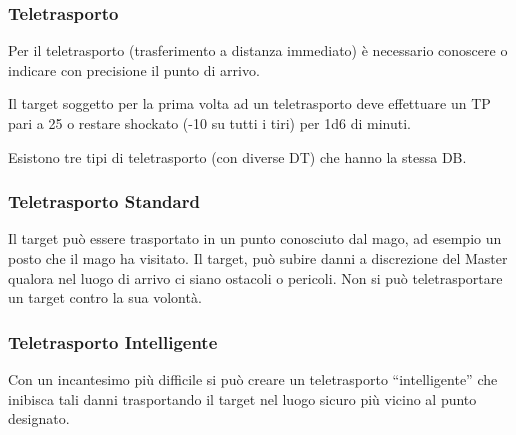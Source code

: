 

\subsubsection{Teletrasporto} Per il teletrasporto (trasferimento a distanza
immediato) \`e necessario conoscere o indicare con precisione il
punto di arrivo. 

Il target soggetto per la prima volta ad un
teletrasporto deve effettuare un TP pari a 25 o restare shockato (-10
su tutti i tiri) per 1d6 di minuti. 

Esistono tre tipi di teletrasporto
(con diverse DT) che hanno la stessa DB. 


\subsubsection{Teletrasporto Standard}
 Il target pu\`o essere trasportato in un punto conosciuto
dal mago, ad esempio un posto che il mago ha visitato. Il target,
pu\`o subire danni a discrezione del Master qualora nel luogo di
arrivo ci siano ostacoli o pericoli. Non si pu\`o teletrasportare un
target contro la sua volont\`a.


\subsubsection{Teletrasporto Intelligente}  
Con un incantesimo pi\`u difficile si pu\`o creare
un teletrasporto ``intelligente'' che inibisca tali
danni trasportando il target nel luogo sicuro pi\`u vicino al punto
designato. 

